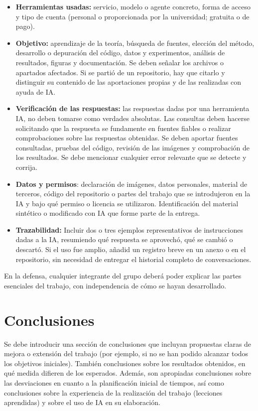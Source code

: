 \documentclass[a4paper]{article}
\theoremstyle{plain} %
\theoremstyle{plain} %
\begin{document}
\begin{itemize}
    \item \textbf{Herramientas usadas:} servicio, modelo o agente concreto, forma de acceso y tipo de cuenta (personal o proporcionada por la universidad; gratuita o de pago).
    \item \textbf{Objetivo:} aprendizaje de la teoría, búsqueda de fuentes, elección del método, desarrollo o depuración del código, datos y experimentos, análisis de resultados, figuras y documentación. Se deben señalar los archivos o apartados afectados. Si se partió de un repositorio, hay que citarlo y distinguir su contenido de las aportaciones propias y de las realizadas con ayuda de IA.
    \item \textbf{Verificación de las respuestas:} las respuestas dadas por una herramienta IA, no deben tomarse como verdades absolutas. Las consultas deben hacerse solicitando que la respuesta se fundamente en fuentes fiables o realizar comprobaciones sobre las respuestas obtenidas. Se deben aportar fuentes consultadas, pruebas del código, revisión de las imágenes y comprobación de los resultados. Se debe mencionar cualquier error relevante que se detecte y corrija.
    \item \textbf{Datos y permisos}: declaración de imágenes, datos personales, material de terceros, código del repositorio o partes del trabajo que se introdujeron en la IA y bajo qué permiso o licencia se utilizaron. Identificación  del material sintético o modificado con IA que forme parte de la entrega.
    \item \textbf{Trazabilidad:} Incluir dos o tres ejemplos representativos de instrucciones dadas a la IA, resumiendo qué respuesta se aprovechó, qué se cambió o descartó. Si el uso fue amplio, añadid un registro breve en un anexo o en el repositorio, sin necesidad de entregar el historial completo de conversaciones.
\end{itemize}


 En la defensa, cualquier integrante del grupo deberá poder explicar las partes esenciales del trabajo, con independencia de cómo se hayan desarrollado.

\section{Conclusiones}

Se debe introducir una sección de conclusiones que incluyan propuestas claras de mejora o extensión del trabajo (por ejemplo, si no se han podido alcanzar todos los objetivos iniciales). También conclusiones sobre los resultados obtenidos, en qué medida difieren de los esperados. Además, son apropiadas conclusiones sobre las desviaciones en cuanto a la planificación inicial de tiempos, así como conclusiones sobre la experiencia de la realización del trabajo (lecciones aprendidas) y sobre el uso de IA en su elaboración.
\end{document}
